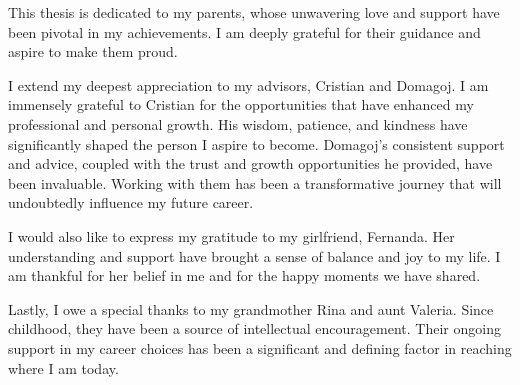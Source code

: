 This thesis is dedicated to my parents, whose unwavering love and support have
been pivotal in my achievements. I am deeply grateful for their guidance and
aspire to make them proud.

I extend my deepest appreciation to my advisors, Cristian and Domagoj. I am
immensely grateful to Cristian for the opportunities that have enhanced my
professional and personal growth. His wisdom, patience, and kindness have
significantly shaped the person I aspire to become. Domagoj's consistent support
and advice, coupled with the trust and growth opportunities he provided, have
been invaluable. Working with them has been a transformative journey that will
undoubtedly influence my future career.

I would also like to express my gratitude to my girlfriend, Fernanda. Her
understanding and support have brought a sense of balance and joy to my life. I
am thankful for her belief in me and for the happy moments we have shared.

Lastly, I owe a special thanks to my grandmother Rina and aunt Valeria. Since
childhood, they have been a source of intellectual encouragement. Their ongoing
support in my career choices has been a significant and defining factor in
reaching where I am today.